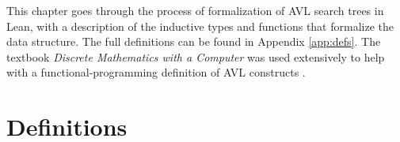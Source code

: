 This chapter goes through the process of formalization of AVL search trees
in Lean, with a description of the inductive types and functions that formalize
the data structure. The full definitions can be found in Appendix \ref{app:defs}.
The textbook \textit{Discrete Mathematics with a Computer} was used extensively to 
help with a functional-programming definition of AVL constructs \cite{avl:computer}.

\section{Definitions}
